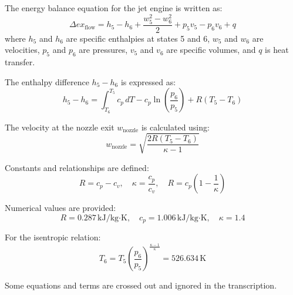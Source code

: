 The energy balance equation for the jet engine is written as:  
\[
\Delta ex_{\text{flow}} = h_5 - h_6 + \frac{w_5^2 - w_6^2}{2} + p_5 v_5 - p_6 v_6 + q
\]  
where \( h_5 \) and \( h_6 \) are specific enthalpies at states 5 and 6, \( w_5 \) and \( w_6 \) are velocities, \( p_5 \) and \( p_6 \) are pressures, \( v_5 \) and \( v_6 \) are specific volumes, and \( q \) is heat transfer.  

The enthalpy difference \( h_5 - h_6 \) is expressed as:  
\[
h_5 - h_6 = \int_{T_6}^{T_5} c_p \, dT - c_p \ln \left( \frac{p_6}{p_5} \right) + R \left( T_5 - T_6 \right)
\]  

The velocity at the nozzle exit \( w_{\text{nozzle}} \) is calculated using:  
\[
w_{\text{nozzle}} = \sqrt{\frac{2R(T_5 - T_6)}{\kappa - 1}}
\]  

Constants and relationships are defined:  
\[
R = c_p - c_v, \quad \kappa = \frac{c_p}{c_v}, \quad R = c_p \left( 1 - \frac{1}{\kappa} \right)
\]  

Numerical values are provided:  
\[
R = 0.287 \, \text{kJ/kg·K}, \quad c_p = 1.006 \, \text{kJ/kg·K}, \quad \kappa = 1.4
\]  

For the isentropic relation:  
\[
T_6 = T_5 \left( \frac{p_6}{p_5} \right)^{\frac{\kappa - 1}{\kappa}} = 526.634 \, \text{K}
\]  

Some equations and terms are crossed out and ignored in the transcription.
